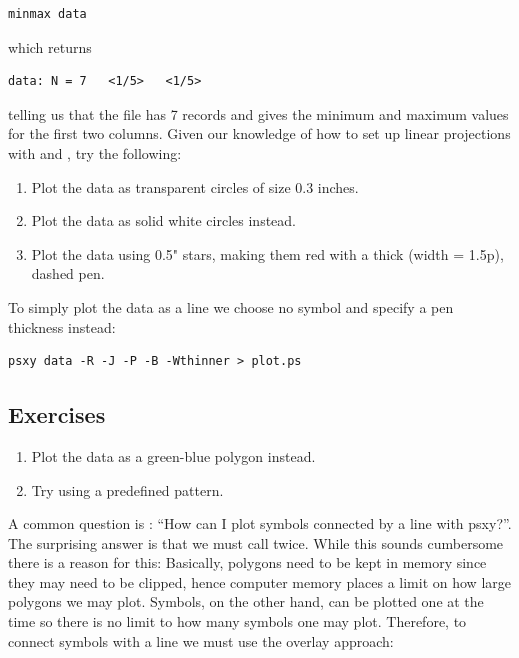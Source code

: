 \documentclass{report}
\begin{document}
{\small\begin{verbatim}
minmax data
\end{verbatim}
}

\noindent
which returns

{\small\begin{verbatim}
data: N = 7   <1/5>   <1/5>
\end{verbatim}
}

\noindent
telling us that the file  has 7 records and gives the
minimum and maximum values for the first two columns.  Given our
knowledge of how to set up linear projections with  and ,
try the following:

\begin{enumerate}

\item Plot the data as transparent circles of size 0.3 inches.

\item Plot the data as solid white circles instead.

\item Plot the data using 0.5" stars, making them red with a thick (width = 1.5p),
dashed pen.

\end{enumerate}

To simply plot the data as a line we choose no symbol and specify a pen thickness instead:

{\small\begin{verbatim} 
psxy data -R -J -P -B -Wthinner > plot.ps
\end{verbatim}
}

\subsection{Exercises}

\begin{enumerate}

\item Plot the data as a green-blue polygon instead.

\item Try using a predefined pattern.

\end{enumerate}

A common question is : ``How can I plot symbols connected by a line
with psxy?''.  The surprising answer is that we must call  twice.
While this sounds cumbersome there is a reason for this:  Basically,
polygons need to be kept in memory since they may need to be clipped,
hence computer memory places a limit on how large polygons we may plot.
Symbols, on the other hand, can be plotted one at the time so there
is no limit to how many symbols one may plot.  Therefore, to connect
symbols with a line we must use the overlay approach:
\end{document}
